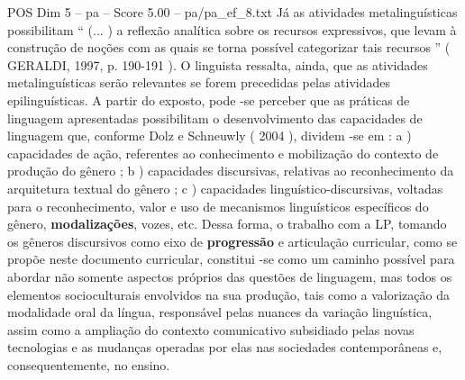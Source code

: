 \begin{textsample}{POS Dim 5 – pa – Score 5.00 – pa/pa\_ef\_8.txt}
Já as atividades metalinguísticas possibilitam “ (... ) a reflexão analítica sobre os recursos expressivos, que levam à construção de noções com as quais se torna possível categorizar tais recursos ” ( GERALDI, 1997, p. 190-191 ).
O linguista ressalta, ainda, que as atividades metalinguísticas serão relevantes se forem precedidas pelas atividades epilinguísticas.
A partir do exposto, pode -se perceber que as práticas de linguagem apresentadas possibilitam o desenvolvimento das capacidades de linguagem que, conforme Dolz e Schneuwly ( 2004 ), dividem -se em : a ) capacidades de ação, referentes ao conhecimento e mobilização do contexto de produção do gênero ; b ) capacidades discursivas, relativas ao reconhecimento da arquitetura textual do gênero ; c ) capacidades linguístico-discursivas, voltadas para o reconhecimento, valor e uso de mecanismos linguísticos específicos do gênero, \textbf{modalizações}, vozes, etc.
Dessa forma, o trabalho com a LP, tomando os gêneros discursivos como eixo de \textbf{progressão} e articulação curricular, como se propõe neste documento curricular, constitui -se como um caminho possível para abordar não somente aspectos próprios das questões de linguagem, mas todos os elementos socioculturais envolvidos na sua produção, tais como a valorização da modalidade oral da língua, responsável pelas nuances da variação linguística, assim como a ampliação do contexto comunicativo subsidiado pelas novas tecnologias e as mudanças operadas por elas nas sociedades contemporâneas e, consequentemente, no ensino.

\end{textsample}
